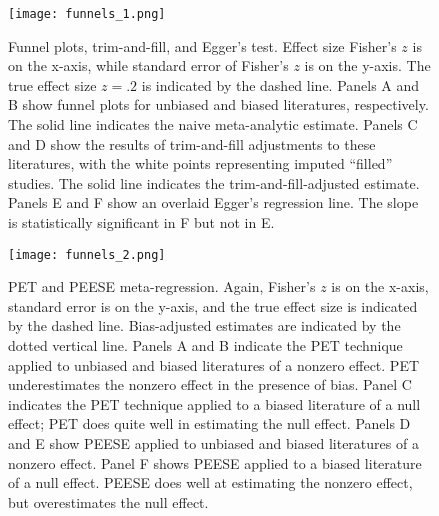 \documentclass[man]{apa6}
\begin{document}


\newpage



\begin{figure}
	\texttt{[image: funnels\_1.png]}
	\caption{Funnel plots, trim-and-fill, and Egger's test. Effect size Fisher's $z$ is on the x-axis, while standard error of Fisher's $z$ is on the y-axis. The true effect size $z = .2$ is indicated by the dashed line. Panels A and B show funnel plots for unbiased and biased literatures, respectively. The solid line indicates the naive meta-analytic estimate. Panels C and D show the results of trim-and-fill adjustments to these literatures, with the white points representing imputed ``filled'' studies. The solid line indicates the trim-and-fill-adjusted estimate. Panels E and F show an overlaid Egger's regression line. The slope is statistically significant in F but not in E.}
	\label{funnels1}
\end{figure}

\begin{figure}
	\texttt{[image: funnels\_2.png]}
	\caption{PET and PEESE meta-regression. Again, Fisher's $z$ is on the x-axis, standard error is on the y-axis, and the true effect size is indicated by the dashed line. Bias-adjusted estimates are indicated by the dotted vertical line. Panels A and B indicate the PET technique applied to unbiased and biased literatures of a nonzero effect. PET underestimates the nonzero effect in the presence of bias. Panel C indicates the PET technique applied to a biased literature of a null effect; PET does quite well in estimating the null effect. Panels D and E show PEESE applied to unbiased and biased literatures of a nonzero effect. Panel F shows PEESE applied to a biased literature of a null effect. PEESE does well at estimating the nonzero effect, but overestimates the null effect.}
	\label{funnels2}
\end{figure}
\end{document}
